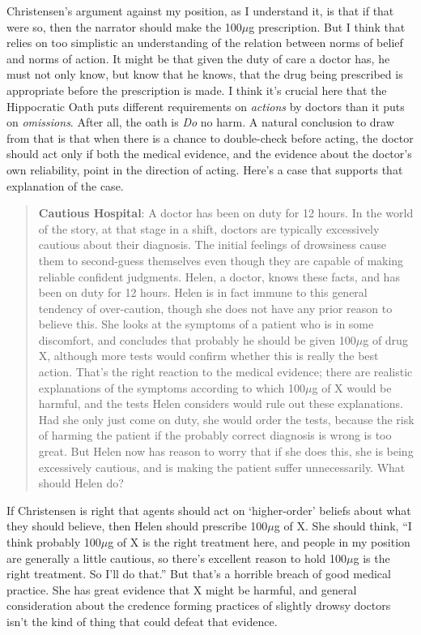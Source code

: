 \documentclass[
  10pt,
  letterpaper,
  DIV=11,
  numbers=noendperiod,
  twoside]{scrartcl}
\begin{document}
Christensen's argument against my position, as I understand it, is that
if that were so, then the narrator should make the 100\(\mu\)g
prescription. But I think that relies on too simplistic an understanding
of the relation between norms of belief and norms of action. It might be
that given the duty of care a doctor has, he must not only know, but
know that he knows, that the drug being prescribed is appropriate before
the prescription is made. I think it's crucial here that the Hippocratic
Oath puts different requirements on \emph{actions} by doctors than it
puts on \emph{omissions}. After all, the oath is \emph{Do} no harm. A
natural conclusion to draw from that is that when there is a chance to
double-check before acting, the doctor should act only if both the
medical evidence, and the evidence about the doctor's own reliability,
point in the direction of acting. Here's a case that supports that
explanation of the case.

\begin{quote}
\textbf{Cautious Hospital}: A doctor has been on duty for 12 hours. In
the world of the story, at that stage in a shift, doctors are typically
excessively cautious about their diagnosis. The initial feelings of
drowsiness cause them to second-guess themselves even though they are
capable of making reliable confident judgments. Helen, a doctor, knows
these facts, and has been on duty for 12 hours. Helen is in fact immune
to this general tendency of over-caution, though she does not have any
prior reason to believe this. She looks at the symptoms of a patient who
is in some discomfort, and concludes that probably he should be given
100\(\mu\)g of drug X, although more tests would confirm whether this is
really the best action. That's the right reaction to the medical
evidence; there are realistic explanations of the symptoms according to
which 100\(\mu\)g of X would be harmful, and the tests Helen considers
would rule out these explanations. Had she only just come on duty, she
would order the tests, because the risk of harming the patient if the
probably correct diagnosis is wrong is too great. But Helen now has
reason to worry that if she does this, she is being excessively
cautious, and is making the patient suffer unnecessarily. What should
Helen do?
\end{quote}

If Christensen is right that agents should act on `higher-order' beliefs
about what they should believe, then Helen should prescribe 100\(\mu\)g
of X. She should think, ``I think probably 100\(\mu\)g of X is the right
treatment here, and people in my position are generally a little
cautious, so there's excellent reason to hold 100\(\mu\)g is the right
treatment. So I'll do that.'' But that's a horrible breach of good
medical practice. She has great evidence that X might be harmful, and
general consideration about the credence forming practices of slightly
drowsy doctors isn't the kind of thing that could defeat that evidence.
\end{document}
